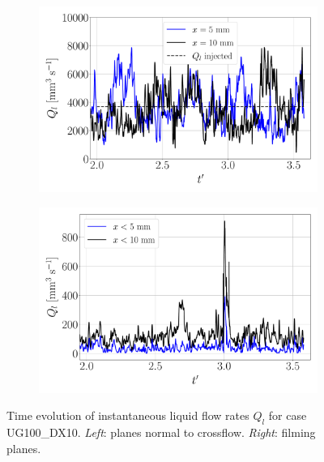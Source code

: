 \begin{figure}[ht]
\flushleft
\begin{subfigure}[b]{0.45\textwidth}
	\centering
   \includegraphics[scale=0.222]{./part2_developments/figures_ch5_resolved_JICF/flow_rates_ibs/inst_Q_iso_x_UG100_dx10}
\end{subfigure}
\hspace{0.4in}
\begin{subfigure}[b]{0.45\textwidth}
	\centering
   \includegraphics[scale=0.222]{./part2_developments/figures_ch5_resolved_JICF/flow_rates_ibs/inst_Q_iso_x_UG100_dx10_filming}
\end{subfigure}
   \vspace*{-0.20in}
\caption[Time evolution of instantaneous liquid flow rates $Q_l$ for case UG100\_DX10.]{Time evolution of instantaneous liquid flow rates $Q_l$ for case UG100\_DX10. \textsl{Left}: planes normal to crossflow. \textsl{Right}: filming planes.}
\label{fig:IB_liquid_flow_rate_inst_evolution_UG100_DX10}
\end{figure}


